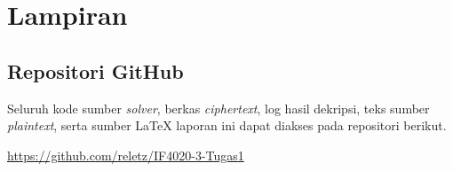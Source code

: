 \chapter*{Lampiran}

\section*{Repositori GitHub}

Seluruh kode sumber \textit{solver}, berkas \textit{ciphertext}, log hasil dekripsi, teks sumber
\textit{plaintext}, serta sumber \LaTeX{} laporan ini dapat diakses pada repositori berikut.

\begin{center}
  \url{https://github.com/reletz/IF4020-3-Tugas1}
\end{center}

